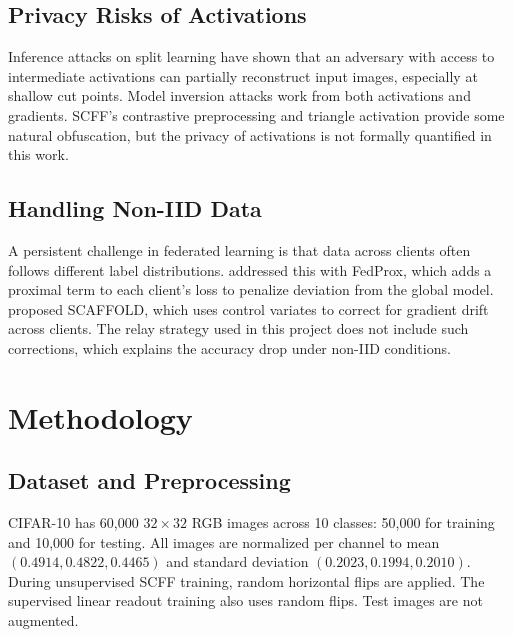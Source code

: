 \documentclass[12pt]{article}
\begin{document}
\subsection{Privacy Risks of Activations}

Inference attacks on split learning \citep{pasquini2021unleashing} have shown that an adversary
with access to intermediate activations can partially reconstruct input images, especially at
shallow cut points. Model inversion attacks \citep{he2019model} work from both activations and
gradients. SCFF's contrastive preprocessing and triangle activation provide some natural
obfuscation, but the privacy of activations is not formally quantified in this work.

\subsection{Handling Non-IID Data}

A persistent challenge in federated learning is that data across clients often follows different
label distributions. \citet{li2020fedprox} addressed this with FedProx, which adds a proximal
term to each client's loss to penalize deviation from the global model.
\citet{karimireddy2020scaffold} proposed SCAFFOLD, which uses control variates to correct for
gradient drift across clients. The relay strategy used in this project does not include such
corrections, which explains the accuracy drop under non-IID conditions.

\section{Methodology}
\label{sec:method}

\subsection{Dataset and Preprocessing}

CIFAR-10 \citep{krizhevsky2009cifar} has 60,000 $32\times32$ RGB images across 10 classes:
50,000 for training and 10,000 for testing. All images are normalized per channel to mean
$(0.4914, 0.4822, 0.4465)$ and standard deviation $(0.2023, 0.1994, 0.2010)$. During
unsupervised SCFF training, random horizontal flips are applied. The supervised linear readout
training also uses random flips. Test images are not augmented.
\end{document}
